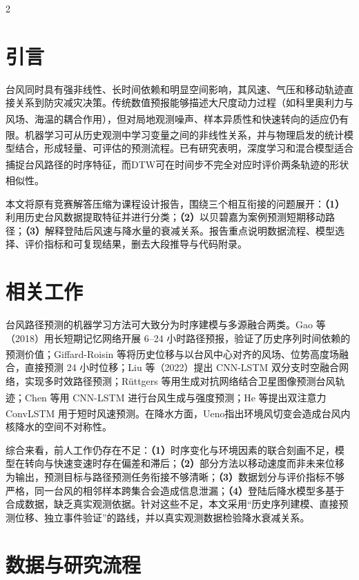 \documentclass[10.5pt,compsoc,UTF8]{CjC}
\newcommand{\upcite}[1]{\textsuperscript{\cite{#1}}}
\begin{document}
\begin{multicols}{2}
\section{引言}
台风同时具有强非线性、长时间依赖和明显空间影响，其风速、气压和移动轨迹直接关系到防灾减灾决策。传统数值预报能够描述大尺度动力过程（如科里奥利力与风场、海温的耦合作用\upcite{wie2012development}），但对局地观测噪声、样本异质性和快速转向的适应仍有限。机器学习可从历史观测中学习变量之间的非线性关系\upcite{vapnik1998statistical,goodfellow2016deep}，并与物理启发的统计模型结合，形成轻量、可评估的预测流程。已有研究表明，深度学习和混合模型适合捕捉台风路径的时序特征\upcite{陈睿2018基于深度学习的台风预测关键技术研究,chen2019hybrid}，而DTW可在时间步不完全对应时评价两条轨迹的形状相似性\upcite{muller2007dynamic}。

本文将原有竞赛解答压缩为课程设计报告，围绕三个相互衔接的问题展开：\textbf{（1）}利用历史台风数据提取特征并进行分类；\textbf{（2）}以贝碧嘉为案例预测短期移动路径；\textbf{（3）}解释登陆后风速与降水量的衰减关系。报告重点说明数据流程、模型选择、评价指标和可复现结果，删去大段推导与代码附录。

\section{相关工作}
台风路径预测的机器学习方法可大致分为时序建模与多源融合两类。Gao 等（2018）用长短期记忆网络开展 6--24 小时路径预报，验证了历史序列时间依赖的预测价值；Giffard-Roisin 等\upcite{giffardroisin2020tropical}将历史位移与以台风中心对齐的风场、位势高度场融合，直接预测 24 小时位移；Liu 等（2022）提出 CNN-LSTM 双分支时空融合网络，实现多时效路径预测；R{\"u}ttgers 等用生成对抗网络结合卫星图像预测台风轨迹\upcite{ruttgers2019prediction}；Chen 等用 CNN-LSTM 进行台风生成与强度预测\upcite{chen2019hybrid}；He 等提出双注意力 ConvLSTM 用于短时风速预测\upcite{he2022dual}。在降水方面，Ueno\upcite{ueno2007observational}指出环境风切变会造成台风内核降水的空间不对称性。

综合来看，前人工作仍存在不足：\textbf{（1）}时序变化与环境因素的联合刻画不足，模型在转向与快速变速时存在偏差和滞后；\textbf{（2）}部分方法以移动速度而非未来位移为输出，预测目标与路径预测任务衔接不够清晰；\textbf{（3）}数据划分与评价指标不够严格，同一台风的相邻样本跨集合会造成信息泄漏；\textbf{（4）}登陆后降水模型多基于合成数据，缺乏真实观测依据。针对这些不足，本文采用“历史序列建模、直接预测位移、独立事件验证”的路线，并以真实观测数据检验降水衰减关系。

\section{数据与研究流程}

\end{multicols}
\end{document}
